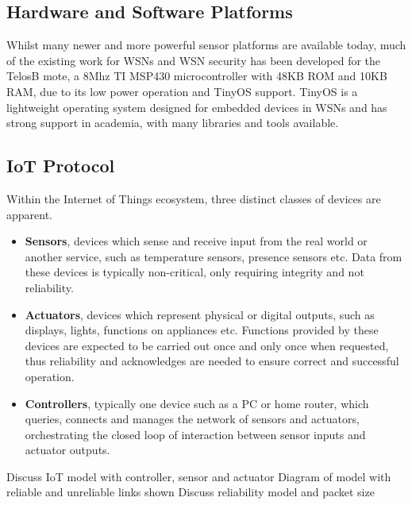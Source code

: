 \documentclass[conference]{./sty/IEEEtran}
\begin{document}
\subsection{Hardware and Software Platforms} %
\label{sec:hardware_and_software_platforms}
Whilst many newer and more powerful sensor platforms are available today, much of the existing work for WSNs and WSN security has been developed for the TelosB mote, a 8Mhz TI MSP430 microcontroller with 48KB ROM and 10KB RAM, due to its low power operation and TinyOS support. TinyOS is a lightweight operating system designed for embedded devices in WSNs and has strong support in academia, with many libraries and tools available. 

\subsection{IoT Protocol} %
\label{sub:iot_protocol}
Within the Internet of Things ecosystem, three distinct classes of devices are apparent.
\begin{itemize}
  \item \textbf{Sensors}, devices which sense and receive input from the real world or another service, such as temperature sensors, presence sensors etc. Data from these devices is typically non-critical, only requiring integrity and not reliability.
  \item \textbf{Actuators}, devices which represent physical or digital outputs, such as displays, lights, functions on appliances etc. Functions provided by these devices are expected to be carried out once and only once when requested, thus reliability and acknowledges are needed to ensure correct and successful operation. 
  \item \textbf{Controllers}, typically one device such as a PC or home router, which queries, connects and manages the network of sensors and actuators, orchestrating the closed loop of interaction between sensor inputs and actuator outputs.
\end{itemize}
Discuss IoT model with controller, sensor and actuator
Diagram of model with reliable and unreliable links shown
Discuss reliability model and packet size
\end{document}

